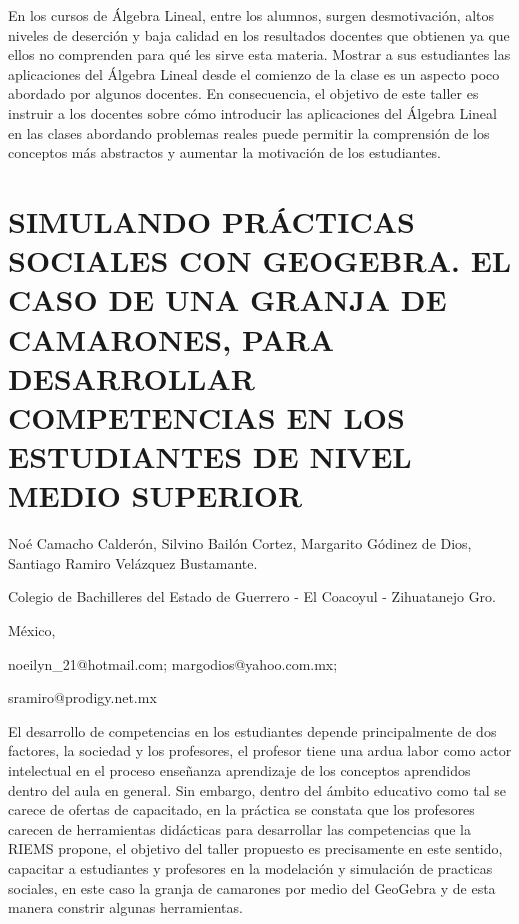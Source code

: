 En los cursos de Álgebra Lineal, entre los alumnos, surgen desmotivación,
altos niveles de deserción y baja calidad en los resultados docentes
que obtienen ya que ellos no comprenden para qué les sirve esta materia.
Mostrar a sus estudiantes las aplicaciones del Álgebra Lineal desde
el comienzo de la clase es un aspecto poco abordado por algunos docentes.
En consecuencia, el objetivo de este taller es instruir a los docentes
sobre cómo introducir las aplicaciones del Álgebra Lineal en las clases
abordando problemas reales puede permitir la comprensión de los conceptos
más abstractos y aumentar la motivación de los estudiantes.

\setcounter{section}{61}


\section{SIMULANDO PRÁCTICAS SOCIALES CON GEOGEBRA. EL CASO DE UNA GRANJA
DE CAMARONES, PARA DESARROLLAR COMPETENCIAS EN LOS ESTUDIANTES DE
NIVEL MEDIO SUPERIOR}

\begin{datos}

Noé Camacho Calderón, Silvino Bailón Cortez, Margarito Gódinez de
Dios, Santiago Ramiro Velázquez Bustamante.

Colegio de Bachilleres del Estado de Guerrero - El Coacoyul - Zihuatanejo
Gro.

México,

noeilyn\_21@hotmail.com; margodios@yahoo.com.mx;

sramiro@prodigy.net.mx

\end{datos}

El desarrollo de competencias en los estudiantes depende principalmente
de dos factores, la sociedad y los profesores, el profesor tiene una
ardua labor como actor intelectual en el proceso enseñanza aprendizaje
de los conceptos aprendidos dentro del aula en general. Sin embargo,
dentro del ámbito educativo como tal se carece de ofertas de capacitado,
en la práctica se constata que los profesores carecen de herramientas
didácticas para desarrollar las competencias que la RIEMS propone,
el objetivo del taller propuesto es precisamente en este sentido,
capacitar a estudiantes y profesores en la modelación y simulación
de practicas sociales, en este caso la granja de camarones por medio
del GeoGebra y de esta manera constrir algunas herramientas. 

\setcounter{section}{63}


